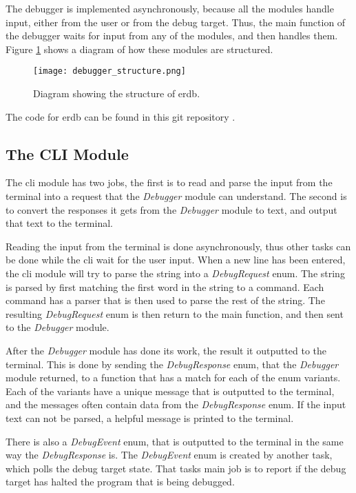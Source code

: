 The debugger is implemented asynchronously, because all the modules handle input, either from the user or from the debug target.
Thus, the main function of the debugger waits for input from any of the modules, and then handles them.
Figure \ref{fig:ERDStruct} shows a diagram of how these modules are structured.


\begin{figure}[h]
	\centering
	\texttt{[image: debugger\_structure.png]}
	\caption{Diagram showing the structure of \gls{erdb}.}
	\label{fig:ERDStruct}
\end{figure}


The code for \gls{erdb} can be found in this git repository \cite{erdb}.


\subsection{The CLI Module} 
The \acrshort{cli} module has two jobs, the first is to read and parse the input from the terminal into a request that the \emph{Debugger} module can understand.
The second is to convert the responses it gets from the \emph{Debugger} module to text, and output that text to the terminal.


Reading the input from the terminal is done asynchronously, thus other tasks can be done while the \acrshort{cli} wait for the user input.
When a new line has been entered, the \acrshort{cli} module will try to parse the string into a \emph{DebugRequest} enum.
The string is parsed by first matching the first word in the string to a command.
Each command has a parser that is then used to parse the rest of the string.
The resulting \emph{DebugRequest} enum is then return to the main function, and then sent to the \emph{Debugger} module.



After the \emph{Debugger} module has done its work, the result it outputted to the terminal.
This is done by sending the \emph{DebugResponse} enum, that the \emph{Debugger} module returned, to a function that has a match for each of the enum variants.
Each of the variants have a unique message that is outputted to the terminal, and the messages often contain data from the \emph{DebugResponse} enum.
If the input text can not be parsed, a helpful message is printed to the terminal.



There is also a \emph{DebugEvent} enum, that is outputted to the terminal in the same way the \emph{DebugResponse} is.
The \emph{DebugEvent} enum is created by another task, which polls the debug target state.
That tasks main job is to report if the debug target has halted the program that is being debugged.



